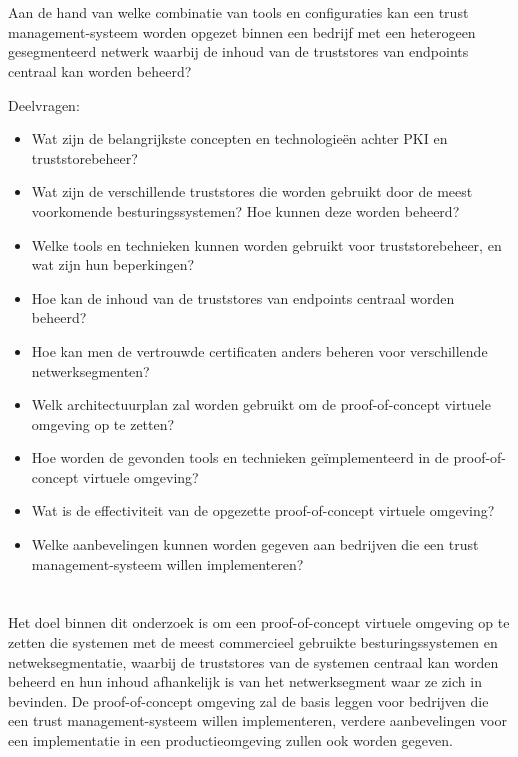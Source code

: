 \section{}%
\label{sec:onderzoeksvraag}

Aan de hand van welke combinatie van tools en configuraties kan een trust management-systeem worden opgezet binnen een bedrijf met een heterogeen gesegmenteerd netwerk waarbij de inhoud van de truststores van endpoints centraal kan worden beheerd?

Deelvragen:
\begin{itemize}
    \item Wat zijn de belangrijkste concepten en technologieën achter PKI en truststorebeheer? 
    \item Wat zijn de verschillende truststores die worden gebruikt door de meest voorkomende besturingssystemen? Hoe kunnen deze worden beheerd?
    \item Welke tools en technieken kunnen worden gebruikt voor truststorebeheer, en wat zijn hun beperkingen? 
    \item Hoe kan de inhoud van de truststores van endpoints centraal worden beheerd?
    \item Hoe kan men de vertrouwde certificaten anders beheren voor verschillende netwerksegmenten?
    \item Welk architectuurplan zal worden gebruikt om de proof-of-concept virtuele omgeving op te zetten?
    \item Hoe worden de gevonden tools en technieken geïmplementeerd in de proof-of-concept virtuele omgeving?
    \item Wat is de effectiviteit van de opgezette proof-of-concept virtuele omgeving?
    \item Welke aanbevelingen kunnen worden gegeven aan bedrijven die een trust management-systeem willen implementeren?
\end{itemize}

\section{}%
\label{sec:onderzoeksdoelstelling}

Het doel binnen dit onderzoek is om een proof-of-concept virtuele omgeving op te zetten die systemen met de meest commercieel gebruikte besturingssystemen en netweksegmentatie, waarbij de truststores van de systemen centraal kan worden beheerd en hun inhoud afhankelijk is van het netwerksegment waar ze zich in bevinden.
De proof-of-concept omgeving zal de basis leggen voor bedrijven die een trust management-systeem willen implementeren, verdere aanbevelingen voor een implementatie in een productieomgeving zullen ook worden gegeven.


